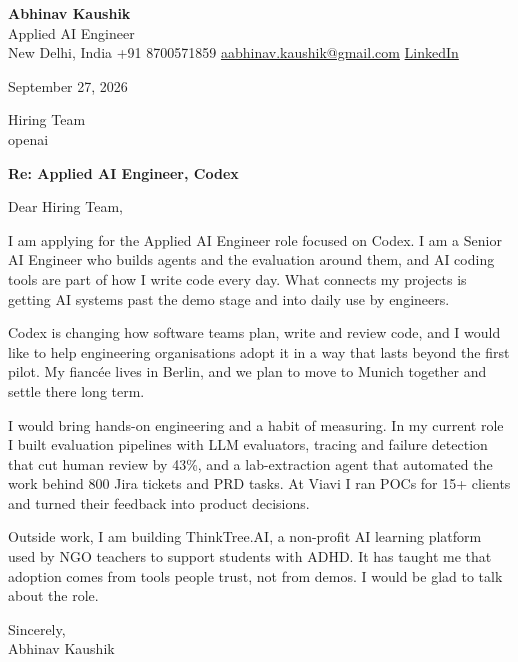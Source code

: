 \documentclass[11pt,a4paper]{article}
\begin{document}
{\Large\bfseries Abhinav Kaushik}\\
Applied AI Engineer\\
New Delhi, India \textbar{} +91 8700571859 \textbar{} \href{mailto:aabhinav.kaushik@gmail.com}{aabhinav.kaushik@gmail.com} \textbar{} \href{https://www.linkedin.com/in/abhinav-kaushik10/}{LinkedIn}  

September 27, 2026

Hiring Team\\
openai

\textbf{Re: Applied AI Engineer, Codex}

Dear Hiring Team,

I am applying for the Applied AI Engineer role focused on Codex. I am a Senior AI Engineer who builds agents and the evaluation around them, and AI coding tools are part of how I write code every day. What connects my projects is getting AI systems past the demo stage and into daily use by engineers.

Codex is changing how software teams plan, write and review code, and I would like to help engineering organisations adopt it in a way that lasts beyond the first pilot. My fiancée lives in Berlin, and we plan to move to Munich together and settle there long term.

I would bring hands-on engineering and a habit of measuring. In my current role I built evaluation pipelines with LLM evaluators, tracing and failure detection that cut human review by 43\%, and a lab-extraction agent that automated the work behind 800 Jira tickets and PRD tasks. At Viavi I ran POCs for 15+ clients and turned their feedback into product decisions.

Outside work, I am building ThinkTree.AI, a non-profit AI learning platform used by NGO teachers to support students with ADHD. It has taught me that adoption comes from tools people trust, not from demos. I would be glad to talk about the role.

Sincerely,\\[4pt]
Abhinav Kaushik
\end{document}

